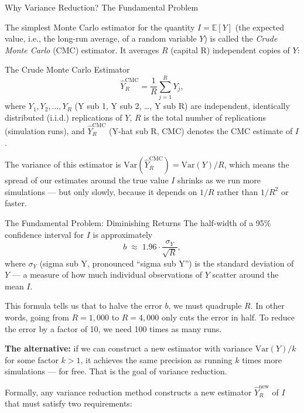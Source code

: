 \documentclass[aspectratio=169,10pt]{beamer}
\begin{document}
\begin{frame}[allowframebreaks]{Why Variance Reduction? The Fundamental Problem}

The simplest Monte Carlo estimator for the quantity $I = \mathbb{E}[Y]$
(the expected value, i.e., the long-run average, of a random variable $Y$)
is called the \emph{Crude Monte Carlo} (CMC) estimator.
It averages $R$ (capital R) independent copies of $Y$:

\begin{block}{The Crude Monte Carlo Estimator}
\[
  \hat{Y}_R^{\mathrm{CMC}} = \frac{1}{R}\sum_{j=1}^{R} Y_j,
\]
where $Y_1, Y_2, \ldots, Y_R$ (Y sub 1, Y sub 2, \ldots, Y sub R) are
independent, identically distributed (i.i.d.) replications of $Y$,
$R$ is the total number of replications (simulation runs), and
$\hat{Y}_R^{\mathrm{CMC}}$ (Y-hat sub R, CMC) denotes the CMC estimate of $I$.
\end{block}

The variance of this estimator is
$\mathrm{Var}(\hat{Y}_R^{\mathrm{CMC}}) = \mathrm{Var}(Y)/R$,
which means the spread of our estimates around the true value $I$ shrinks
as we run more simulations — but only slowly, because it depends on $1/R$
rather than $1/R^2$ or faster.

\framebreak

\begin{alertblock}{The Fundamental Problem: Diminishing Returns}
The half-width of a 95\% confidence interval for $I$ is approximately
\[
  b \;\approx\; 1.96 \cdot \frac{\sigma_Y}{\sqrt{R}},
\]
where $\sigma_Y$ (sigma sub Y, pronounced ``sigma sub Y'') is the standard
deviation of $Y$ — a measure of how much individual observations of $Y$
scatter around the mean $I$.

This formula tells us that to halve the error $b$, we must quadruple $R$.
In other words, going from $R = 1{,}000$ to $R = 4{,}000$ only cuts the
error in half.  To reduce the error by a factor of 10, we need 100 times
as many runs.

\medskip
\textbf{The alternative:} if we can construct a new estimator with variance
$\mathrm{Var}(Y)/k$ for some factor $k > 1$, it achieves the same precision
as running $k$ times more simulations --- for free.
That is the goal of variance reduction.
\end{alertblock}

\framebreak

Formally, any variance reduction method constructs a new estimator
$\hat{Y}_R^{\mathrm{new}}$ of $I$ that must satisfy two requirements:


\end{frame}
\end{document}

